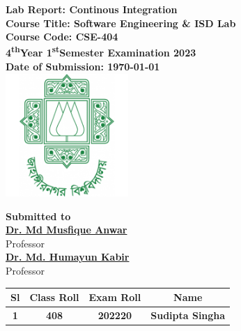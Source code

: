 \documentclass[a4paper,12pt]{article}
\begin{document}
\begin{center}
    \textbf{\large{Lab Report: Continous Integration}}\\
    \vspace{0.2cm}
    \textbf{Course Title: Software Engineering \& ISD Lab}\\
    \vspace{0.2cm}
    \textbf{Course Code: CSE-404}\\
    \vspace{0.2cm}
    \textbf{4\textsuperscript{th}Year 1\textsuperscript{st}Semester Examination 2023}\\
    \vspace{0.5cm}
    \textbf{Date of Submission: \today}\\

    \vspace{1.5cm}
    \includegraphics[width=0.35\textwidth]{images/logo.png}\\ %
    \vspace{1cm}

    \textbf{Submitted to}\\
    \vspace{0.2cm}
    \textbf{\href{https://juniv.edu/teachers/musfique.anwar}{Dr. Md Musfique Anwar}}\\
    {Professor}\\
    \vspace{0.2cm}
    \textbf{\href{https://juniv.edu/teachers/hkabir}{Dr. Md. Humayun Kabir}}\\
    {Professor}\\


    \vspace{1cm}

    \begin{table}[h!]
        \centering
        \begin{tabular}{|c|c|c|c|}
            \hline
            \rowcolor[HTML]{2F4F4F} %
            {\color[HTML]{FFFFFF}\textbf{Sl}}& {\color[HTML]{FFFFFF}\textbf{Class Roll}}& {\color[HTML]{FFFFFF}\textbf{Exam Roll}}& {\color[HTML]{FFFFFF}\textbf{Name}}\\ \hline
            \rowcolor[HTML]{B0E0E6}
            \textbf{1}& \textbf{408} & \textbf{202220} & \textbf{Sudipta Singha} \\ \hline
       

\end{tabular}
\end{table}
\end{center}
\end{document}

